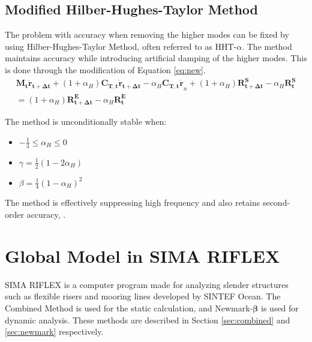 \subsection{Modified Hilber-Hughes-Taylor Method}
\label{sec:HHT}
The problem with accuracy when removing the higher modes can be fixed by using Hilber-Hughes-Taylor Method, often referred to as HHT-$\alpha$. The method maintains accuracy while introducing artificial damping of the higher modes. This is done through the modification of Equation \ref{eq:new}. 
\begin{equation}
\begin{split}
   \boldsymbol{M_t \ddot{r}_{t+\Delta t}} + (1+\alpha_H)\boldsymbol{C_{T,t}\dot{r}_{t+\Delta t}}  -\alpha_H\boldsymbol{C_{T,t}\dot{r}}_{n}+ (1+\alpha_H)\boldsymbol{R_{t+\Delta t}^S}-\alpha_H\boldsymbol{R_{t}^S}\\=(1+\alpha_H) \boldsymbol{R_{t+\Delta t}^E}-\alpha_H\boldsymbol{R_{t}^E}
   \end{split}
\end{equation}

The method is unconditionally stable when:
\begin{itemize}
    \item $-\frac{1}{3} \leq \alpha_H \leq 0 $
    \item  $\gamma = \frac{1}{2} (1-2 \alpha_H)$
    \item  $\beta = \frac{1}{4} (1- \alpha_H)^2$
\end{itemize}

\noindent The method is effectively suppressing high frequency and also retains second-order accuracy, \cite{Mathisen1990}.

\section{Global Model in SIMA RIFLEX}
SIMA RIFLEX is a computer program made for analyzing slender structures such as flexible risers and mooring lines developed by SINTEF Ocean. The Combined Method is used for the static calculation, and Newmark-$\boldsymbol{\beta}$ is used for dynamic analysis. These methods are described in Section \ref{sec:combined} and \ref{sec:newmark} respectively. 


